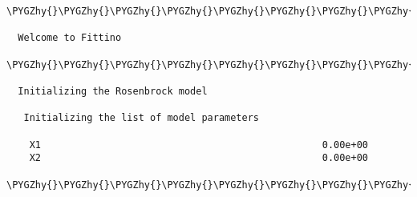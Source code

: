 \documentclass[letterpaper,10pt,english]{sphinxmanual}
\def\PYGZhy{\char`\-}
\begin{document}
\begin{Verbatim}[commandchars=\\\{\}]
\PYGZhy{}\PYGZhy{}\PYGZhy{}\PYGZhy{}\PYGZhy{}\PYGZhy{}\PYGZhy{}\PYGZhy{}\PYGZhy{}\PYGZhy{}\PYGZhy{}\PYGZhy{}\PYGZhy{}\PYGZhy{}\PYGZhy{}\PYGZhy{}\PYGZhy{}\PYGZhy{}\PYGZhy{}\PYGZhy{}\PYGZhy{}\PYGZhy{}\PYGZhy{}\PYGZhy{}\PYGZhy{}\PYGZhy{}\PYGZhy{}\PYGZhy{}\PYGZhy{}\PYGZhy{}\PYGZhy{}\PYGZhy{}\PYGZhy{}\PYGZhy{}\PYGZhy{}\PYGZhy{}\PYGZhy{}\PYGZhy{}\PYGZhy{}\PYGZhy{}\PYGZhy{}\PYGZhy{}\PYGZhy{}\PYGZhy{}\PYGZhy{}\PYGZhy{}\PYGZhy{}\PYGZhy{}\PYGZhy{}\PYGZhy{}\PYGZhy{}\PYGZhy{}\PYGZhy{}\PYGZhy{}\PYGZhy{}\PYGZhy{}\PYGZhy{}\PYGZhy{}\PYGZhy{}\PYGZhy{}\PYGZhy{}\PYGZhy{}\PYGZhy{}\PYGZhy{}\PYGZhy{}\PYGZhy{}\PYGZhy{}\PYGZhy{}\PYGZhy{}\PYGZhy{}\PYGZhy{}\PYGZhy{}\PYGZhy{}\PYGZhy{}\PYGZhy{}\PYGZhy{}\PYGZhy{}\PYGZhy{}\PYGZhy{}\PYGZhy{}\PYGZhy{}\PYGZhy{}\PYGZhy{}\PYGZhy{}\PYGZhy{}\PYGZhy{}\PYGZhy{}

  Welcome to Fittino

\PYGZhy{}\PYGZhy{}\PYGZhy{}\PYGZhy{}\PYGZhy{}\PYGZhy{}\PYGZhy{}\PYGZhy{}\PYGZhy{}\PYGZhy{}\PYGZhy{}\PYGZhy{}\PYGZhy{}\PYGZhy{}\PYGZhy{}\PYGZhy{}\PYGZhy{}\PYGZhy{}\PYGZhy{}\PYGZhy{}\PYGZhy{}\PYGZhy{}\PYGZhy{}\PYGZhy{}\PYGZhy{}\PYGZhy{}\PYGZhy{}\PYGZhy{}\PYGZhy{}\PYGZhy{}\PYGZhy{}\PYGZhy{}\PYGZhy{}\PYGZhy{}\PYGZhy{}\PYGZhy{}\PYGZhy{}\PYGZhy{}\PYGZhy{}\PYGZhy{}\PYGZhy{}\PYGZhy{}\PYGZhy{}\PYGZhy{}\PYGZhy{}\PYGZhy{}\PYGZhy{}\PYGZhy{}\PYGZhy{}\PYGZhy{}\PYGZhy{}\PYGZhy{}\PYGZhy{}\PYGZhy{}\PYGZhy{}\PYGZhy{}\PYGZhy{}\PYGZhy{}\PYGZhy{}\PYGZhy{}\PYGZhy{}\PYGZhy{}\PYGZhy{}\PYGZhy{}\PYGZhy{}\PYGZhy{}\PYGZhy{}\PYGZhy{}\PYGZhy{}\PYGZhy{}\PYGZhy{}\PYGZhy{}\PYGZhy{}\PYGZhy{}\PYGZhy{}\PYGZhy{}\PYGZhy{}\PYGZhy{}\PYGZhy{}\PYGZhy{}\PYGZhy{}\PYGZhy{}\PYGZhy{}\PYGZhy{}\PYGZhy{}\PYGZhy{}\PYGZhy{}

  Initializing the Rosenbrock model

   Initializing the list of model parameters

    X1                                                 0.00e+00
    X2                                                 0.00e+00

\PYGZhy{}\PYGZhy{}\PYGZhy{}\PYGZhy{}\PYGZhy{}\PYGZhy{}\PYGZhy{}\PYGZhy{}\PYGZhy{}\PYGZhy{}\PYGZhy{}\PYGZhy{}\PYGZhy{}\PYGZhy{}\PYGZhy{}\PYGZhy{}\PYGZhy{}\PYGZhy{}\PYGZhy{}\PYGZhy{}\PYGZhy{}\PYGZhy{}\PYGZhy{}\PYGZhy{}\PYGZhy{}\PYGZhy{}\PYGZhy{}\PYGZhy{}\PYGZhy{}\PYGZhy{}\PYGZhy{}\PYGZhy{}\PYGZhy{}\PYGZhy{}\PYGZhy{}\PYGZhy{}\PYGZhy{}\PYGZhy{}\PYGZhy{}\PYGZhy{}\PYGZhy{}\PYGZhy{}\PYGZhy{}\PYGZhy{}\PYGZhy{}\PYGZhy{}\PYGZhy{}\PYGZhy{}\PYGZhy{}\PYGZhy{}\PYGZhy{}\PYGZhy{}\PYGZhy{}\PYGZhy{}\PYGZhy{}\PYGZhy{}\PYGZhy{}\PYGZhy{}\PYGZhy{}\PYGZhy{}\PYGZhy{}\PYGZhy{}\PYGZhy{}\PYGZhy{}\PYGZhy{}\PYGZhy{}\PYGZhy{}\PYGZhy{}\PYGZhy{}\PYGZhy{}\PYGZhy{}\PYGZhy{}\PYGZhy{}\PYGZhy{}\PYGZhy{}\PYGZhy{}\PYGZhy{}\PYGZhy{}\PYGZhy{}\PYGZhy{}\PYGZhy{}\PYGZhy{}\PYGZhy{}\PYGZhy{}\PYGZhy{}\PYGZhy{}\PYGZhy{}


\end{Verbatim}
\end{document}
